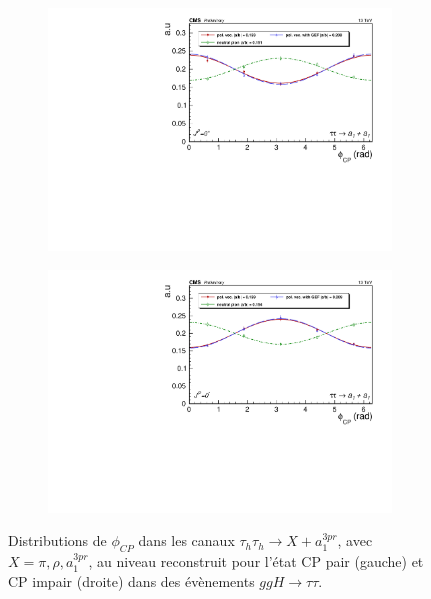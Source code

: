 \begin{figure}[]
    \begin{subfigure}[b]{0.5\linewidth}
    \centering
    \includegraphics[width=\linewidth]{Chapitre6/Images/A1A1/A1A1_even_reco.pdf} 
    \caption*{} 
    \vspace{0.5ex}
  \end{subfigure}%
  \begin{subfigure}[b]{0.5\linewidth}
    \centering
    \includegraphics[width=\linewidth]{Chapitre6/Images/A1A1/A1A1_odd_reco.pdf} 
    \caption*{} 
    \vspace{0.5ex}
  \end{subfigure} 
  
  \caption{Distributions de $\phi_{CP}$ dans les canaux $\tau_h\tau_h\rightarrow X+a_1^{3pr}$, avec $X=\pi,\rho,a^{3pr}_1$, au niveau reconstruit pour l'état CP pair (gauche) et CP impair (droite) dans des évènements $ggH\to\tau\tau$.}
  \label{CPreco}
\end{figure}

